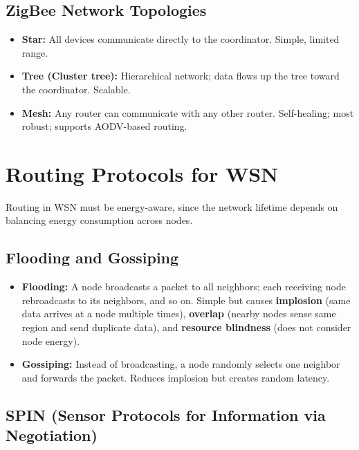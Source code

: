 \documentclass[12pt,a4paper]{article}
\begin{document}
\subsection{ZigBee Network Topologies}
\begin{itemize}[leftmargin=*, itemsep=3pt]
  \item \textbf{Star:} All devices communicate directly to the coordinator. Simple, limited range.
  \item \textbf{Tree (Cluster tree):} Hierarchical network; data flows up the tree toward the coordinator. Scalable.
  \item \textbf{Mesh:} Any router can communicate with any other router. Self-healing; most robust; supports AODV-based routing.
\end{itemize}

\section{Routing Protocols for WSN}

Routing in WSN must be energy-aware, since the network lifetime depends on balancing energy consumption across nodes.

\subsection{Flooding and Gossiping}

\begin{itemize}[leftmargin=*, itemsep=3pt]
  \item \textbf{Flooding:} A node broadcasts a packet to all neighbors; each receiving node rebroadcasts to its neighbors, and so on. Simple but causes \textbf{implosion} (same data arrives at a node multiple times), \textbf{overlap} (nearby nodes sense same region and send duplicate data), and \textbf{resource blindness} (does not consider node energy).
  \item \textbf{Gossiping:} Instead of broadcasting, a node randomly selects one neighbor and forwards the packet. Reduces implosion but creates random latency.
\end{itemize}

\subsection{SPIN (Sensor Protocols for Information via Negotiation)}
\end{document}
